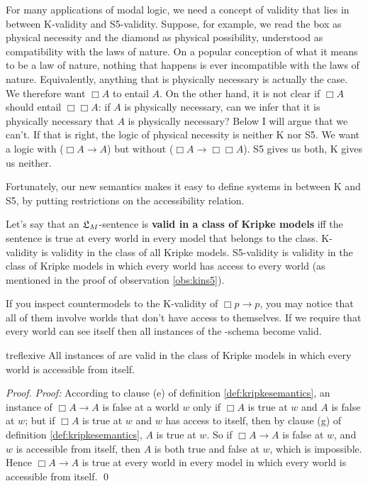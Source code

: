 For many applications of modal logic, we need a concept of validity that lies in
between K-validity and S5-validity. Suppose, for example, we read the box as
physical necessity and the diamond as physical possibility, understood as
compatibility with the laws of nature. On a popular conception of what it means
to be a law of nature, nothing that happens is ever incompatible with the laws
of nature. Equivalently, anything that is physically necessary is actually the
case. We therefore want $\Box A$ to entail $A$. On the other hand, it is not
clear if $\Box A$ should entail $\Box\Box A$: if $A$ is physically necessary,
can we infer that it is physically necessary that $A$ is physically necessary?
Below I will argue that we can't. If that is right, the logic of physical
necessity is neither K nor S5. We want a logic with  ($\Box A \to A$)
but without  ($\Box A \to \Box\Box A$). S5 gives us both, K gives us
neither.

Fortunately, our new semantics makes it easy to define systems in between K and S5, by
putting restrictions on the accessibility relation.

Let's say that an $\mathfrak{L}_M$-sentence is \textbf{valid in a class of Kripke models}
iff the sentence is true at every world in every model that belongs to the
class. K-validity is validity in the class of all Kripke models. S5-validity is
validity in the class of Kripke models in which every world has access to every
world (as mentioned in the proof of observation \ref{obs:kins5}).


If you inspect countermodels to the K-validity of $\Box p \to p$, you may notice
that all of them involve worlds that don't have access to themselves. If we
require that every world can see itself then all instances of the -schema
become valid.

\begin{observation}{treflexive}
  All instances of  are valid in the class of Kripke models in which every
  world is accessible from itself.
\end{observation}
%
\begin{proof}
  \emph{Proof:} According to clause (e) of definition \ref{def:kripkesemantics},
  an instance of $\Box A \to A$ is false at a world $w$ only if $\Box A$ is true
  at $w$ and $A$ is false at $w$; but if $\Box A$ is true at $w$ and $w$ has access to
  itself, then by clause (g) of definition \ref{def:kripkesemantics}, $A$ is
  true at $w$. So if $\Box A \to A$ is false at $w$, and $w$ is accessible from
  itself, then $A$ is both true and false at $w$, which is impossible. Hence
  $\Box A \to A$ is true at every world in every model in which every world is
  accessible from itself. \qed
\end{proof}

